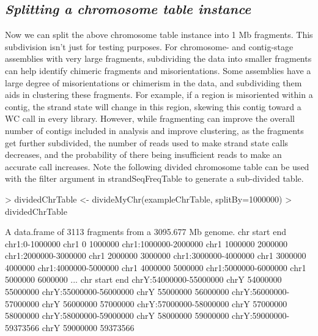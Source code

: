 \documentclass{article}
\begin{document}
\subsection{\textit{Splitting a chromosome table instance}}

Now we can split the above chromosome table instance into 1 Mb fragments. This subdivision isn't just for testing purposes. For chromosome- and contig-stage assemblies with very large fragments, subdividing the data into smaller fragments can help identify chimeric fragments and misorientations. Some assemblies have a large degree of misorientations or chimerism in the data, and subdividing them aids in clustering these fragments.  For example, if a region is misoriented within a contig, the strand state will change in this region, skewing this contig toward a WC call in every library. However, while fragmenting can improve the overall number of contigs included in analysis and improve clustering, as the fragments get further subdivided, the number of reads used to make strand state calls decreases, and the probability of there being insufficient reads to make an accurate call increases.  Note the following divided chromosome table can be used with the filter argument in strandSeqFreqTable
to generate a sub-divided table.

\begin{Schunk}
\begin{Sinput}
> dividedChrTable <- divideMyChr(exampleChrTable, splitBy=1000000)
> dividedChrTable
\end{Sinput}
\begin{Soutput}
A data.frame of 3113 fragments from a 3095.677 Mb genome.
                      chr   start     end
chr1:0-1000000       chr1       0 1000000
chr1:1000000-2000000 chr1 1000000 2000000
chr1:2000000-3000000 chr1 2000000 3000000
chr1:3000000-4000000 chr1 3000000 4000000
chr1:4000000-5000000 chr1 4000000 5000000
chr1:5000000-6000000 chr1 5000000 6000000
...
                        chr    start      end
chrY:54000000-55000000 chrY 54000000 55000000
chrY:55000000-56000000 chrY 55000000 56000000
chrY:56000000-57000000 chrY 56000000 57000000
chrY:57000000-58000000 chrY 57000000 58000000
chrY:58000000-59000000 chrY 58000000 59000000
chrY:59000000-59373566 chrY 59000000 59373566
\end{Soutput}
\end{Schunk}
\end{document}
